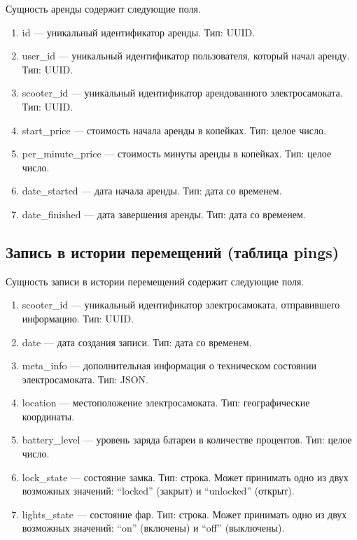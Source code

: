 Сущность аренды содержит следующие поля.

\begin{enumerate}
	\item id --- уникальный идентификатор аренды. Тип: UUID.
	\item user\_id --- уникальный идентификатор пользователя, который начал аренду. Тип:
	      UUID.
	\item scooter\_id --- уникальный идентификатор арендованного электросамоката. Тип:
	      UUID.
	\item start\_price --- стоимость начала аренды в копейках. Тип: целое число.
	\item per\_minute\_price --- стоимость минуты аренды в копейках. Тип: целое число.
	\item date\_started --- дата начала аренды. Тип: дата со временем.
	\item date\_finished --- дата завершения аренды. Тип: дата со временем.
\end{enumerate}

\subsection{Запись в истории перемещений (таблица pings)}

Сущность записи в истории перемещений содержит следующие поля.

\begin{enumerate}
	\item scooter\_id --- уникальный идентификатор электросамоката, отправившего
	      информацию. Тип: UUID.
	\item date --- дата создания записи. Тип: дата со временем.
	\item meta\_info --- дополнительная информация о техническом состоянии
	      электросамоката. Тип: JSON.
	\item location --- местоположение электросамоката. Тип: географические координаты.
	\item battery\_level --- уровень заряда батареи в количестве процентов. Тип: целое
	      число.
	\item lock\_state --- состояние замка. Тип: строка. Может принимать одно из двух
	      возможных значений: \enquote{locked} (закрыт) и \enquote{unlocked} (открыт).
	\item lights\_state --- состояние фар. Тип: строка. Может принимать одно из двух
	      возможных значений: \enquote{on} (включены) и \enquote{off} (выключены).
\end{enumerate}

